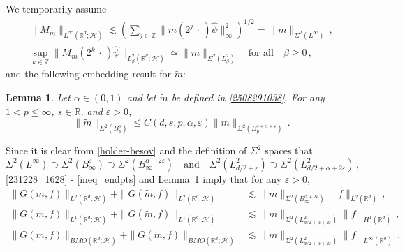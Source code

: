 \documentclass[11pt]{amsart}
\theoremstyle{plain}
\newtheorem{lemma}[theorem]{Lemma}
\theoremstyle{definition}
\theoremstyle{remark}
\numberwithin{equation}{section}
\newcommand{\bR}{\mathbb{R}}
\newcommand{\bZ}{\mathbb{Z}}
\newcommand{\wt}{\widetilde}
\begin{document}
We temporarily assume
\begin{gather}
        \|M_m\|_{L^\infty(\bR^d; \mathcal{H})}
    \lesssim \left(\sum_{j\in\bZ}\|m(2^j\,\cdot\,)\widehat{\psi}\|_\infty^2\right)^{1/2}
    = \|m\|_{\Sigma^2(L^\infty)}\,,\label{ineq_L2esti}\\
    \sup_{k\in\bZ}\|M_m(2^k\,\cdot\,)\widehat{\psi}\|_{L_\beta^2(\bR^d; \mathcal{H})} \simeq \|m\|_{\Sigma^2(L_\beta^2)}\quad\text{for all}\quad \beta\geq0\,,\label{ineq_endpts}
\end{gather}
and the following embedding result for $\widetilde{m}$:
\begin{lemma}\label{lem_emb}
Let $\alpha\in(0,1)$ and let $\widetilde{m}$ be defined in \eqref{2508291038}.
For any $1<p\leq \infty$, $s\in\bR$, and $\varepsilon>0$, 
$$
\|\wt{m}\|_{\Sigma^2(B_p^s)}\leq C(d,s,p,\alpha,\varepsilon)\|m\|_{\Sigma^2(B_p^{s+\alpha+\varepsilon})}\,.
$$
\end{lemma}
Since it is clear from \eqref{holder-besov} and the definition of $\Sigma^2$ spaces that
$$
\Sigma^2(L^{\infty})\supset \Sigma^2(B_\infty^\varepsilon)\supset \Sigma^2(B_\infty^{\alpha+2\varepsilon})\quad \text{and}\quad \Sigma^2(L^2_{d/2+\varepsilon})\supset \Sigma^2(L^2_{d/2+\alpha+2\varepsilon})\,,
$$
\eqref{231228_1628} - \eqref{ineq_endpts} and Lemma~\ref{lem_emb} imply that for any $\varepsilon>0$,
    \begin{align}
    \| G(m, f) \|_{L^2(\bR^d; \mathcal{H})}+\| G(\widetilde{m}, f) \|_{L^2(\bR^d; \mathcal{H})}
    &\lesssim \|m\|_{\Sigma^2(B_\infty^{\alpha+2\varepsilon})} \|f\|_{L^2(\bR^d)}\,,\label{231228_1707}\\
    \| G(m, f) \|_{L^1(\bR^d; \mathcal{H})}+\| G(\widetilde{m}, f) \|_{L^1(\bR^d; \mathcal{H})}
    &\lesssim \|m\|_{\Sigma^2(L^2_{d/2+\alpha+2\varepsilon})}\|f\|_{H^1(\bR^d)}\,,\label{231228_1708}\\
    \| G(m, f) \|_{BMO(\bR^d; \mathcal{H})}+\| G(\widetilde{m}, f) \|_{BMO(\bR^d; \mathcal{H})}
    &\lesssim \|m\|_{\Sigma^2(L^2_{d/2+\alpha+2\varepsilon})} \|f\|_{L^\infty(\bR^d)}\,.\label{231228_1709}
\end{align}
\end{document}
